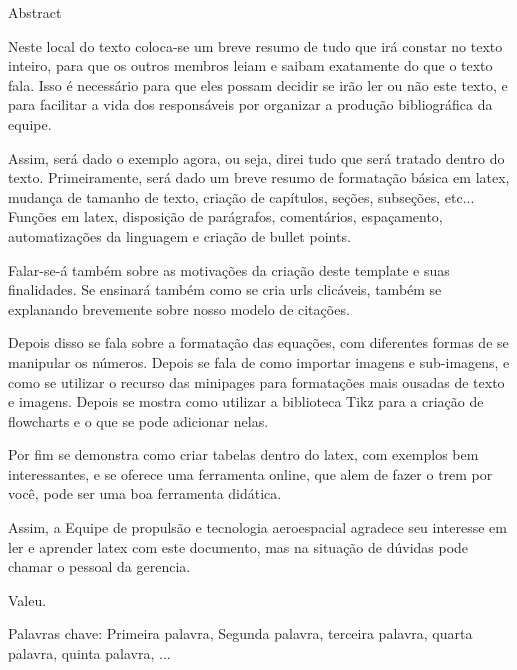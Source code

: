 {
	\thispagestyle{empty}     %
	
	{\LARGE Abstract\\} %
	
	Neste local do texto coloca-se um breve resumo de tudo que irá constar no texto inteiro, para que os outros membros leiam e saibam exatamente do que o texto fala. Isso é necessário para que eles possam decidir se irão ler ou não este texto, e para facilitar a vida dos responsáveis por organizar a produção bibliográfica da equipe.
	
	Assim, será dado o exemplo agora, ou seja, direi tudo que será tratado dentro do texto. Primeiramente, será dado um breve resumo de formatação básica em latex, mudança de tamanho de texto, criação de capítulos, seções, subseções, etc... Funções em latex, disposição de parágrafos, comentários, espaçamento, automatizações da linguagem e criação de bullet points.
	
	Falar-se-á também sobre as motivações da criação deste template e suas finalidades. Se ensinará também como se cria urls clicáveis, também se explanando brevemente sobre nosso modelo de citações.
	
	Depois disso se fala sobre a formatação das equações, com diferentes formas de se manipular os números. Depois se fala de como importar imagens e sub-imagens, e como se utilizar o recurso das minipages para formatações mais ousadas de texto e imagens. Depois se mostra como utilizar a biblioteca Tikz para a criação de flowcharts e o que se pode adicionar nelas.
	
	Por fim se demonstra como criar tabelas dentro do latex, com exemplos bem interessantes, e se oferece uma ferramenta online, que alem de fazer o trem por você, pode ser uma boa ferramenta didática.
	
	Assim, a Equipe de propulsão e tecnologia aeroespacial agradece seu interesse em ler e aprender latex com este documento, mas na situação de dúvidas pode chamar o pessoal da gerencia. 
	
	Valeu.
	
	\vspace{1cm}
	{\large Palavras chave:} {\small Primeira palavra, Segunda palavra, terceira palavra, quarta palavra, quinta palavra, ...}

}

